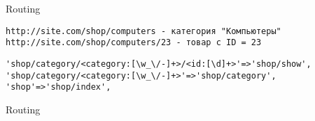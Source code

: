 \begin{frame}[fragile]{Routing}
  \begin{center}
    \scriptsize
    \begin{verbatim}
http://site.com/shop/computers - категория "Компьютеры"
http://site.com/shop/computers/23 - товар с ID = 23
    \end{verbatim}
        \begin{verbatim}
'shop/category/<category:[\w_\/-]+>/<id:[\d]+>'=>'shop/show',
'shop/category/<category:[\w_\/-]+>'=>'shop/category',
'shop'=>'shop/index',
        \end{verbatim}
  \end{center}
\end{frame}

\begin{frame}[fragile]{Routing}
  \begin{center}
    
  \end{center}
\end{frame}


